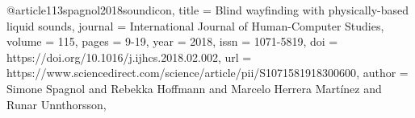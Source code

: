 @article{113spagnol2018soundicon,
title = {Blind wayfinding with physically-based liquid sounds},
journal = {International Journal of Human-Computer Studies},
volume = {115},
pages = {9-19},
year = {2018},
issn = {1071-5819},
doi = {https://doi.org/10.1016/j.ijhcs.2018.02.002},
url = {https://www.sciencedirect.com/science/article/pii/S1071581918300600},
author = {Simone Spagnol and Rebekka Hoffmann and Marcelo {Herrera Martínez} and Runar Unnthorsson},
}